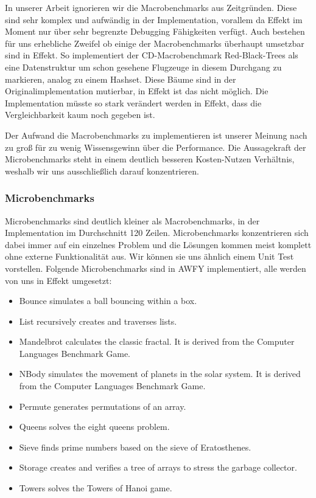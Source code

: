 In unserer Arbeit ignorieren wir die Macrobenchmarks aus Zeitgründen. Diese sind sehr komplex und aufwändig in der Implementation, vorallem da Effekt im Moment nur über sehr begrenzte Debugging Fähigkeiten verfügt. Auch bestehen für uns erhebliche Zweifel ob einige der Macrobenchmarks überhaupt umsetzbar sind in Effekt. So implementiert der CD-Macrobenchmark Red-Black-Trees als eine Datenstruktur um schon gesehene Flugzeuge in diesem Durchgang zu markieren, analog zu einem Hashset.
Diese Bäume sind in der Originalimplementation mutierbar, in Effekt ist das nicht möglich. Die Implementation müsste so stark verändert werden in Effekt, dass die Vergleichbarkeit kaum noch gegeben ist.

Der Aufwand die Macrobenchmarks zu implementieren ist unserer Meinung nach zu groß für zu wenig Wissensgewinn über die Performance.
Die Aussagekraft der Microbenchmarks steht in einem deutlich besseren Kosten-Nutzen Verhältnis, weshalb wir uns ausschließlich darauf konzentrieren.

\subsubsection{Microbenchmarks}
Microbenchmarks sind deutlich kleiner als Macrobenchmarks, in der Implementation im Durchschnitt 120 Zeilen. %
Microbenchmarks konzentrieren sich dabei immer auf ein einzelnes Problem und die Lösungen kommen meist komplett ohne externe Funktionalität aus. Wir können sie uns ähnlich einem Unit Test vorstellen.
Folgende Microbenchmarks sind in AWFY implementiert, alle werden von uns in Effekt umgesetzt:
\begin{itemize}
    \item Bounce simulates a ball bouncing within a box.
    \item List recursively creates and traverses lists.
    \item Mandelbrot calculates the classic fractal. It is derived from the Computer Languages Benchmark Game.
    \item NBody simulates the movement of planets in the solar system. It is derived from the Computer Languages Benchmark Game.
    \item Permute generates permutations of an array.
    \item Queens solves the eight queens problem.
    \item Sieve finds prime numbers based on the sieve of Eratosthenes.
    \item Storage creates and verifies a tree of arrays to stress the garbage collector.
    \item Towers solves the Towers of Hanoi game.
\end{itemize}

